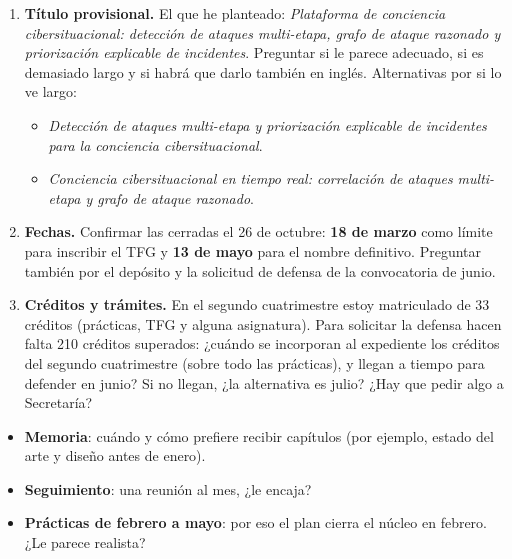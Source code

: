 \documentclass[11pt,a4paper]{article}
\begin{document}
\begin{duda}
\begin{enumerate}[leftmargin=*,itemsep=3pt]
  \item \textbf{Título provisional.} El que he planteado: \emph{Plataforma de conciencia cibersituacional: detección
        de ataques multi-etapa, grafo de ataque razonado y priorización explicable de incidentes}. Preguntar si le
        parece adecuado, si es demasiado largo y si habrá que darlo también en inglés. Alternativas por si lo ve largo:
        \begin{itemize}[leftmargin=*,itemsep=0pt,topsep=1pt]
          \item \emph{Detección de ataques multi-etapa y priorización explicable de incidentes para la conciencia
                cibersituacional}.
          \item \emph{Conciencia cibersituacional en tiempo real: correlación de ataques multi-etapa y grafo de ataque
                razonado}.
        \end{itemize}
  \item \textbf{Fechas.} Confirmar las cerradas el 26 de octubre: \textbf{18 de marzo} como límite para inscribir el
        TFG y \textbf{13 de mayo} para el nombre definitivo. Preguntar también por el depósito y la solicitud de
        defensa de la convocatoria de junio.
  \item \textbf{Créditos y trámites.} En el segundo cuatrimestre estoy matriculado de 33 créditos (prácticas, TFG y
        alguna asignatura). Para solicitar la defensa hacen falta 210 créditos superados: ¿cuándo se incorporan al
        expediente los créditos del segundo cuatrimestre (sobre todo las prácticas), y llegan a tiempo para defender en
        junio? Si no llegan, ¿la alternativa es julio? ¿Hay que pedir algo a Secretaría?
\end{enumerate}
\end{duda}

\begin{duda}
\begin{itemize}[leftmargin=*,itemsep=1pt]
  \item \textbf{Memoria}: cuándo y cómo prefiere recibir capítulos (por ejemplo, estado del arte y diseño antes de enero).
  \item \textbf{Seguimiento}: una reunión al mes, ¿le encaja?
  \item \textbf{Prácticas de febrero a mayo}: por eso el plan cierra el núcleo en febrero. ¿Le parece realista?
\end{itemize}
\end{duda}
\end{document}
